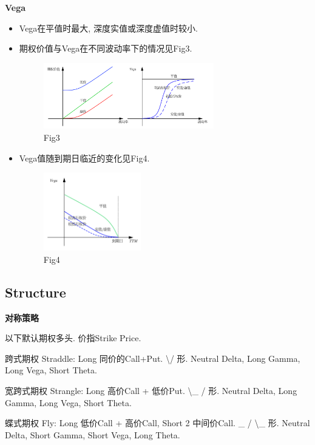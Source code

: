 \documentclass[UTF8]{ctexart}
\begin{document}
\noindent \textbf{Vega} \par 
\begin{itemize}
\item Vega在平值时最大, 深度实值或深度虚值时较小.
\item 期权价值与Vega在不同波动率下的情况见Fig3.
\begin{figure}[H]
    \centering
    \includegraphics[width=0.7\textwidth]{fig/fig3.png}
    \caption{Fig3}
\end{figure}
\item Vega值随到期日临近的变化见Fig4.
\begin{figure}[H]
    \centering
    \includegraphics[width=0.4\textwidth]{fig/fig4.png}
    \caption{Fig4}
\end{figure}

\end{itemize}


\subsection{Structure}


\noindent \textbf{对称策略} \par 

以下默认期权多头. 价指Strike Price.

跨式期权 Straddle: Long 同价的Call+Put.
\textbackslash / 形.
Neutral Delta, Long Gamma, Long Vega, Short Theta.

宽跨式期权 Strangle: Long 高价Call + 低价Put.
\textbackslash \_ / 形.
Neutral Delta, Long Gamma, Long Vega, Short Theta.

蝶式期权 Fly: Long 低价Call + 高价Call, Short 2 中间价Call.
\_ / \textbackslash \_ 形.
Neutral Delta, Short Gamma, Short Vega, Long Theta.
\end{document}
